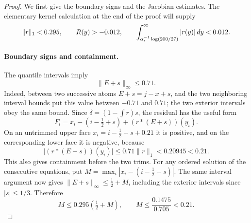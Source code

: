 \begin{proof}
We first give the boundary signs and the Jacobian estimates. The elementary kernel calculation at the end of the proof will supply
\begin{equation}\label{eq:counting-kernel-numbers}
 \|r\|_1<0.295,\qquad
 R(y)>-0.012,\qquad
 \int_{\alpha_{\rm r}^{-1}\log(200/27)}^\infty |r(y)|\,dy<0.012.
\end{equation}

\paragraph{Boundary signs and containment.}
The quantile intervals imply
\[
 \|E+s\|_\infty\le0.71.
\]
Indeed, between two successive atoms \(E+s=j-x+s\), and the two neighboring interval bounds put this value between \(-0.71\) and \(0.71\); the two exterior intervals obey the same bound. Since \(\delta=(1-\int r)s\), the residual has the useful form
\[
 F_i=x_i-(i-\tfrac12+s)+(r*(E+s))(y_i).
\]
On an untrimmed upper face \(x_i=i-\tfrac12+s+0.21\) it is positive, and on the corresponding lower face it is negative, because
\[
 \bigl|(r*(E+s))(y_i)\bigr|
 \le0.71\|r\|_1<0.20945<0.21.
\]
This also gives containment before the two trims. For any ordered solution of the consecutive equations, put
\(M=\max_i|x_i-(i-\tfrac12+s)|\). The same interval argument now gives
\(\|E+s\|_\infty\le\tfrac12+M\), including the exterior intervals since
\(|s|\le1/3\). Therefore
\[
 M\le0.295(\tfrac12+M),\qquad
 M\le\frac{0.1475}{0.705}<0.21.
\]


\end{proof}
